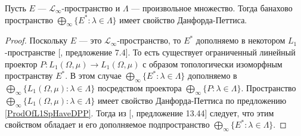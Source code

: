 \begin{proposition}\label{ProdOfDualsOfMthscrLInftySpHaveDPP} Пусть $E$ --- $\mathscr{L}_\infty$-пространство и $\Lambda$ --- произвольное множество. Тогда банахово пространство $\bigoplus_\infty\{E^*:\lambda\in\Lambda\}$ имеет свойство Данфорда-Петтиса.
\end{proposition}
\begin{proof} Поскольку $E$ --- это $\mathscr{L}_\infty$-пространство, то $E^*$ дополняемо в некотором $L_1$-пространстве [\cite{LinPelAbsSumOpInLpSpAndApp}, предложение 7.4]. То есть существует ограниченный линейный проектор $P:L_1(\Omega,\mu)\to L_1(\Omega,\mu)$ с образом топологически изоморфным пространству $E^*$. В этом случае $\bigoplus_\infty\{ E^*:\lambda\in\Lambda\}$ дополняемо в $\bigoplus_\infty\{ L_1(\Omega,\mu):\lambda\in\Lambda\}$ посредством проектора $\bigoplus_\infty\{P:\lambda\in\Lambda\}$. Пространство $\bigoplus_\infty\{ L_1(\Omega,\mu):\lambda\in\Lambda\}$ имеет свойство Данфорда-Петтиса по предложению \ref{ProdOfL1SpHaveDPP}. Тогда из [\cite{FabHabBanSpTh}, предложение 13.44] следует, что этим свойством обладает и его дополняемое подпространство $\bigoplus_\infty\{ E^*:\lambda\in\Lambda\}$.
\end{proof}

